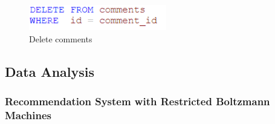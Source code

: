 \begin{CJK*}{UTF8}{gbsn}
\begin{figure}[htbp]
\centering
\includegraphics[width=6cm]{del_com.png}
\caption{Delete comments}
\end{figure}


\subsection{Data Analysis}
\subsubsection{Recommendation System with Restricted Boltzmann Machines}


\end{CJK*}
